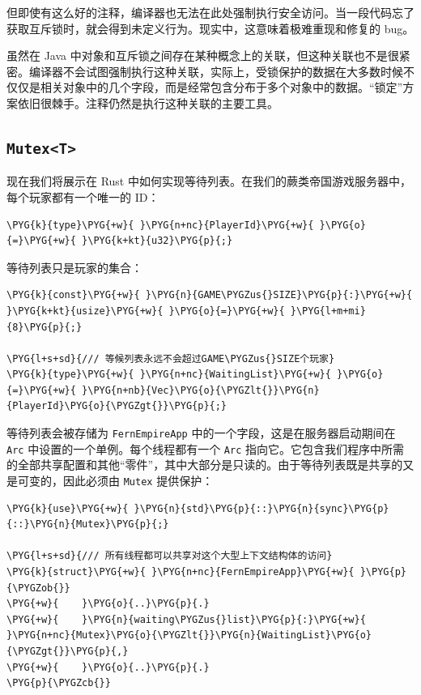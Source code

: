 但即使有这么好的注释，编译器也无法在此处强制执行安全访问。当一段代码忘了获取互斥锁时，就会得到未定义行为。现实中，这意味着极难重现和修复的 bug。

虽然在 Java 中对象和互斥锁之间存在某种概念上的关联，但这种关联也不是很紧密。编译器不会试图强制执行这种关联，实际上，受锁保护的数据在大多数时候不仅仅是相关对象中的几个字段，而是经常包含分布于多个对象中的数据。“锁定”方案依旧很棘手。注释仍然是执行这种关联的主要工具。

\subsection{\texttt{Mutex<T>}}

现在我们将展示在 Rust 中如何实现等待列表。在我们的蕨类帝国游戏服务器中，每个玩家都有一个唯一的 ID：

\begin{Verbatim}[commandchars=\\\{\},breaklines=true,breakanywhere=true,fontsize=\codefont,xleftmargin=17bp]
\PYG{k}{type}\PYG{+w}{ }\PYG{n+nc}{PlayerId}\PYG{+w}{ }\PYG{o}{=}\PYG{+w}{ }\PYG{k+kt}{u32}\PYG{p}{;}
\end{Verbatim}

等待列表只是玩家的集合：

\begin{Verbatim}[commandchars=\\\{\},breaklines=true,breakanywhere=true,fontsize=\codefont,xleftmargin=17bp]
\PYG{k}{const}\PYG{+w}{ }\PYG{n}{GAME\PYGZus{}SIZE}\PYG{p}{:}\PYG{+w}{ }\PYG{k+kt}{usize}\PYG{+w}{ }\PYG{o}{=}\PYG{+w}{ }\PYG{l+m+mi}{8}\PYG{p}{;}

\PYG{l+s+sd}{/// 等候列表永远不会超过GAME\PYGZus{}SIZE个玩家}
\PYG{k}{type}\PYG{+w}{ }\PYG{n+nc}{WaitingList}\PYG{+w}{ }\PYG{o}{=}\PYG{+w}{ }\PYG{n+nb}{Vec}\PYG{o}{\PYGZlt{}}\PYG{n}{PlayerId}\PYG{o}{\PYGZgt{}}\PYG{p}{;}
\end{Verbatim}

等待列表会被存储为 \texttt{FernEmpireApp} 中的一个字段，这是在服务器启动期间在 \texttt{Arc} 中设置的一个单例。每个线程都有一个 \texttt{Arc} 指向它。它包含我们程序中所需的全部共享配置和其他“零件”，其中大部分是只读的。由于等待列表既是共享的又是可变的，因此必须由 \texttt{Mutex} 提供保护：

\begin{Verbatim}[commandchars=\\\{\},breaklines=true,breakanywhere=true,fontsize=\codefont,xleftmargin=17bp]
\PYG{k}{use}\PYG{+w}{ }\PYG{n}{std}\PYG{p}{::}\PYG{n}{sync}\PYG{p}{::}\PYG{n}{Mutex}\PYG{p}{;}

\PYG{l+s+sd}{/// 所有线程都可以共享对这个大型上下文结构体的访问}
\PYG{k}{struct}\PYG{+w}{ }\PYG{n+nc}{FernEmpireApp}\PYG{+w}{ }\PYG{p}{\PYGZob{}}
\PYG{+w}{    }\PYG{o}{..}\PYG{p}{.}
\PYG{+w}{    }\PYG{n}{waiting\PYGZus{}list}\PYG{p}{:}\PYG{+w}{ }\PYG{n+nc}{Mutex}\PYG{o}{\PYGZlt{}}\PYG{n}{WaitingList}\PYG{o}{\PYGZgt{}}\PYG{p}{,}
\PYG{+w}{    }\PYG{o}{..}\PYG{p}{.}
\PYG{p}{\PYGZcb{}}
\end{Verbatim}

